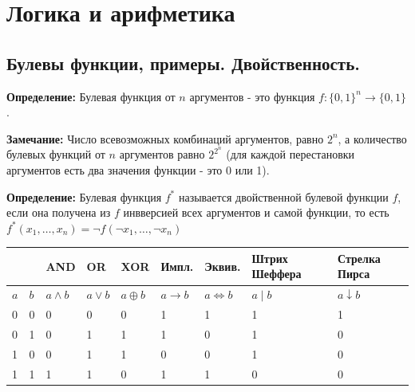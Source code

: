 \setcounter{section}{0}
\section{Логика и арифметика}

\subsection{Булевы функции, примеры. Двойственность.}
\textbf{Определение:} Булевая функция от $n$ аргументов - это функция $f: \{0,1\}^n\to \{0,1\}$. 

\textbf{Замечание:} Число всевозможных комбинаций аргументов, равно $2^n$, а количество булевых функций от $n$ аргументов равно $2^{2^n}$ (для каждой перестановки аргументов есть два значения функции - это 0 или 1).

\par \textbf{Определение:} Булевая функция $f^*$ называется двойственной булевой функции $f$, если она получена из $f$ инвверсией всех аргументов и самой функции, то есть \newline $f^*(x_1,\ldots,x_n)=\neg f(\neg x_1,\ldots,\neg x_n)$
\hfill \break

\begin{tabular}{| l | l | l | l | l | l | l | l | l |}
    \hline
    & & AND & OR & XOR & Импл. & Эквив. & Штрих Шеффера & Стрелка Пирса\\ 
    \hline
    $a$ & $b$ & $a\land b$ & $a\lor b$ & $a\oplus b$ & $a\rightarrow b$ & $a\Leftrightarrow b$ & $a\;|\;b$ & $a\downarrow b$\\ 
    \hline
    0 & 0 & 0 & 0 & 0 & 1 & 1 & 1 & 1\\
    0 & 1 & 0 & 1 & 1 & 1 & 0 & 1 & 0\\
    1 & 0 & 0 & 1 & 1 & 0 & 0 & 1 & 0\\
    1 & 1 & 1 & 1 & 0 & 1 & 1 & 0 & 0\\
\hline
\end{tabular}

